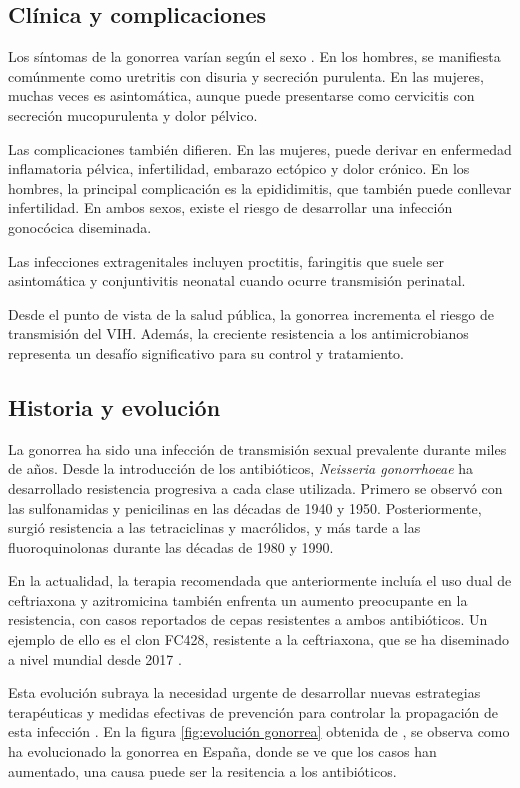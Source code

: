 \subsection{Clínica y complicaciones}
Los síntomas de la gonorrea varían según el sexo \cite{unemo2019gonorrhoea}. En los hombres, se manifiesta comúnmente como uretritis con disuria y secreción purulenta. En las mujeres, muchas veces es asintomática, aunque puede presentarse como cervicitis con secreción mucopurulenta y dolor pélvico.

Las complicaciones también difieren. En las mujeres, puede derivar en enfermedad inflamatoria pélvica, infertilidad, embarazo ectópico y dolor crónico. En los hombres, la principal complicación es la epididimitis, que también puede conllevar infertilidad. En ambos sexos, existe el riesgo de desarrollar una infección gonocócica diseminada.

Las infecciones extragenitales incluyen proctitis, faringitis que suele ser asintomática y conjuntivitis neonatal cuando ocurre transmisión perinatal.

Desde el punto de vista de la salud pública, la gonorrea incrementa el riesgo de transmisión del VIH. Además, la creciente resistencia a los antimicrobianos representa un desafío significativo para su control y tratamiento.

\subsection{Historia y evolución}
La gonorrea ha sido una infección de transmisión sexual prevalente durante miles de años. Desde la introducción de los antibióticos, \textit{Neisseria gonorrhoeae} ha desarrollado resistencia progresiva a cada clase utilizada. Primero se observó con las sulfonamidas y penicilinas en las décadas de 1940 y 1950. Posteriormente, surgió resistencia a las tetraciclinas y macrólidos, y más tarde a las fluoroquinolonas durante las décadas de 1980 y 1990.

En la actualidad, la terapia recomendada que anteriormente incluía el uso dual de ceftriaxona y azitromicina también enfrenta un aumento preocupante en la resistencia, con casos reportados de cepas resistentes a ambos antibióticos. Un ejemplo de ello es el clon FC428, resistente a la ceftriaxona, que se ha diseminado a nivel mundial desde 2017 \cite{golparian2020genomic}.

Esta evolución subraya la necesidad urgente de desarrollar nuevas estrategias terapéuticas y medidas efectivas de prevención para controlar la propagación de esta infección \cite{lin2021epidemiology}.
En la figura \ref{fig:evolución gonorrea} obtenida de \cite{isanidad2023}, se observa como ha evolucionado la gonorrea en España, donde se ve que los casos han aumentado, una causa puede ser la resitencia a los antibióticos.

